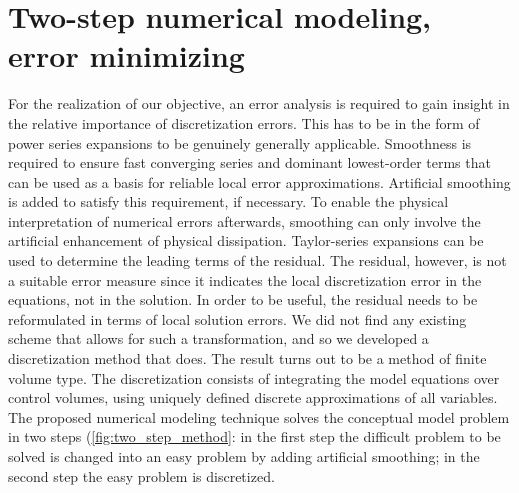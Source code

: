 \chapter{Two-step numerical modeling, error minimizing}\label{sec:error_minimizing}

For the realization of our objective, an error analysis is required to gain insight in the relative importance of discretization errors.
This has to be in the form of power series expansions to be genuinely generally applicable.
Smoothness is required to ensure fast converging series and dominant lowest-order terms that can be used as a basis for reliable local error approximations.
Artificial smoothing is added to satisfy this requirement, if necessary.
To enable the physical interpretation of numerical errors afterwards, smoothing can only involve the artificial enhancement of physical dissipation.
Taylor-series expansions can be used to determine the leading terms of the residual.
The residual, however, is not a suitable error measure since it indicates the local discretization error in the equations, not in the solution. 
In order
to be useful, the residual needs to be reformulated in terms of local solution
errors.
We did not find any existing scheme that allows for such a transformation, and so we developed a discretization method that does.
The result turns out to be a method of finite volume type.
The discretization consists of integrating the model equations over control volumes, using uniquely defined discrete approximations of all variables.
The proposed numerical modeling technique solves the conceptual model problem in two steps (\autoref{fig:two_step_method}: in the first step the difficult problem to be solved is changed into an easy problem by adding artificial smoothing; in the second step the easy problem is discretized.

